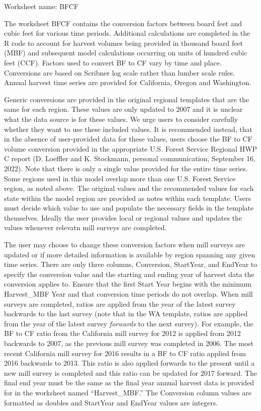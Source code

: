\documentclass[
  openany]{book}
\begin{document}
Worksheet name: BFCF

The worksheet BFCF contains the conversion factors between board feet
and cubic feet for various time periods. Additional calculations are
completed in the R code to account for harvest volumes being provided in
thousand board feet (MBF) and subsequent model calculations occurring on
units of hundred cubic feet (CCF). Factors used to convert BF to CF vary
by time and place. Conversions are based on Scribner log scale rather
than lumber scale rules. Annual harvest time series are provided for
California, Oregon and Washington.

Generic conversions are provided in the original regional templates that
are the same for each region. These values are only updated to 2007 and
it is unclear what the data source is for these values. We urge users to
consider carefully whether they want to use these included values. It is
recommended instead, that in the absence of user-provided data for these
values, users choose the BF to CF volume conversion provided in the
appropriate U.S. Forest Service Regional HWP C report (D. Loeffler and
K. Stockmann, personal communication, September 16, 2022). Note that
there is only a single value provided for the entire time series. Some
regions used in this model overlap more than one U.S. Forest Service
region, as noted above. The original values and the recommended values
for each state within the model region are provided as notes within each
template. Users must decide which value to use and populate the
necessary fields in the template themselves. Ideally the user provides
local or regional values and updates the values whenever relevatn mill
surveys are completed.

The user may choose to change these conversion factors when mill surveys
are updated or if more detailed information is available by region
spanning any given time series. There are only three columns,
Conversion, StartYear, and EndYear to specify the conversion value and
the starting and ending year of harvest data the conversion applies to.
Ensure that the first Start Year begins with the minimum Harvest\_MBF
Year and that conversion time periods do not overlap. When mill surveys
are completed, ratios are applied from the year of the latest survey
backwards to the last survey (note that in the WA template, ratios are
applied from the year of the latest survey \emph{forwards} to the next
survey). For example, the BF to CF ratio from the California mill survey
for 2012 is applied from 2012 backwards to 2007, as the previous mill
survey was completed in 2006. The most recent California mill survey for
2016 results in a BF to CF ratio applied from 2016 backwards to 2013.
This ratio is also applied forwards to the present until a new mill
survey is completed and this ratio can be updated for 2017 forward. The
final end year must be the same as the final year annual harvest data is
provided for in the worksheet named ``Harvest\_MBF.'' The Conversion
column values are formatted as doubles and StartYear and EndYear values
are integers.
\end{document}
